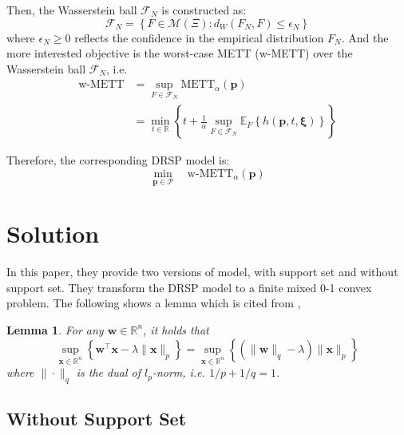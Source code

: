 \documentclass{article}
\newtheorem{lem}{Lemma}
\begin{document}
Then, the Wasserstein ball $\mathcal{F}_N$ is constructed as:
\begin{equation}
	\mathcal{F}_N = \left\{F \in \mathcal{M}(\Xi) : d_W(F_N, F)\leq \epsilon_N \right\}
\end{equation}
where $\epsilon_N \geq 0$ reflects the confidence in the empirical distribution $F_N$. And the more interested objective is the worst-case METT (w-METT) over the Wasserstein ball $\mathcal{F}_N$, i.e.
\begin{align}
	\text{w-METT} & = \sup_{F \in \mathcal{F}_N} \text{METT}_\alpha (\bm{p}) \\
	& = \min_{t \in \mathbb{R}} \left\{t + \frac{1}{\alpha} \sup_{F \in \mathcal{F}_N} \mathbb{E}_{F}\left\{h(\bm{p}, t, \bm{\xi})\right\}\right\}
\end{align}

Therefore, the corresponding DRSP model is:
\begin{equation}
	\min_{\bm{p} \in \mathcal{P}} \quad \text{w-METT}_\alpha(\bm{p})
\end{equation}

\section{Solution}

In this paper, they provide two versions of model, with support set and without support set. They transform the DRSP model to a finite mixed 0-1 convex problem. The following shows a lemma which is cited from \cite{RN372}, 

\begin{lem}  \label{lem}
	For any $\bm{w} \in \mathbb{R}^n$, it holds that 
	\begin{equation}
		\sup_{\bm{x} \in \mathbb{R}^n} \left\{\bm{w}^\top \bm{x} - \lambda \|\bm{x}\|_p\right\} = \sup_{\bm{x} \in \mathbb{R}^n} \left\{ (\|\bm{w}\|_q - \lambda) \|\bm{x}\|_p \right\}
	\end{equation}
	where $\| \cdot \|_q$ is the dual of $l_p$-norm, i.e. $1/p + 1/q = 1$. 
\end{lem}

\subsection{Without Support Set}
\end{document}
